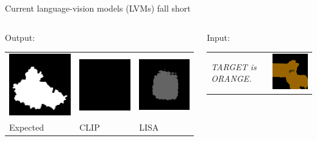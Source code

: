 \documentclass[14pt,aspectratio=169]{beamer}
\begin{document}
\begin{frame}{Current language-vision models (LVMs) fall short}
\begin{columns}
\begin{column}{0.48\textwidth}
\medskip
Output: \\
\begin{tabular}{ l l l @{}}
\includegraphics[width=.25\textwidth]{compgeo/GL006_046_oracle_output_reference.png}
&
\includegraphics[width=.25\textwidth]{compgeo/GL006_046_oracle_output_clip.png}
&
\includegraphics[width=.25\textwidth]{compgeo/GL006_046_oracle_output_lisa.jpg}
\\
Expected & CLIP & LISA
\end{tabular}
\end{column}
\pause
\begin{column}{0.48\textwidth}
Input: \\
\smallskip
\begin{tabular}{ p{} l @{}}
\textit{TARGET is ORANGE.} &
\includegraphics[align=t,width=.25\textwidth]{compgeo/GL024_425_color_input.png}
\end{tabular}


\end{column}
\end{columns}
\end{frame}
\end{document}
